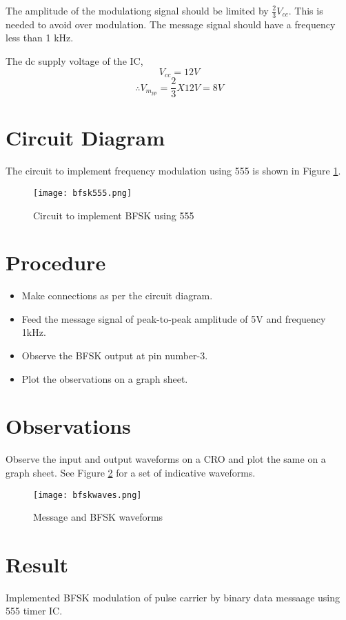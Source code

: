 The amplitude of the modulationg signal should be limited by $\frac{2}{3}V_{cc}$. This is needed to avoid over modulation. The message signal should have a frequency less than 1 kHz.

The dc supply voltage of the IC, 
\begin{equation}
V_{cc}=12 V
\end{equation}
\begin{equation}
\therefore V_{m_{pp}}=\frac{2}{3}X12 V=8V
\end{equation}
\section*{Circuit Diagram}
The circuit to implement frequency modulation using 555 is shown in Figure \ref{bfsk555ckt}.

\begin{figure}
\texttt{[image: bfsk555.png]}
\caption{Circuit to implement BFSK using 555}
\label{bfsk555ckt}
\end{figure}

\section*{Procedure}

\begin{itemize}
\item
Make connections as per the circuit diagram.

\item

Feed the message signal of peak-to-peak amplitude of 5V and frequency 1kHz.
\item Observe the BFSK output at pin number-3.

\item
Plot the observations on a graph sheet.
\end{itemize}


\section*{Observations}
Observe the input and output waveforms on a CRO and plot the same on a graph sheet. See Figure \ref{bfskwaves} for a set of indicative waveforms.


\begin{figure}
\begin{center}
\texttt{[image: bfskwaves.png]}
\caption{Message and BFSK waveforms}
\label{bfskwaves}
\end{center}


\end{figure}

\section*{Result}
Implemented BFSK modulation of pulse carrier by binary data messaage using 555 timer IC.




